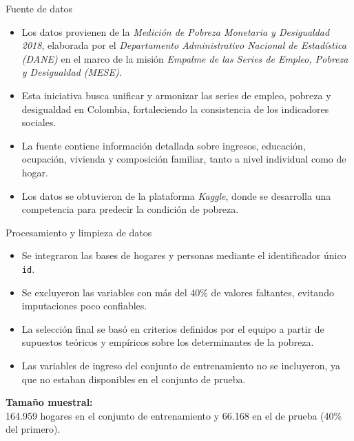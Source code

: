 \documentclass[10pt]{beamer}
\begin{document}
\begin{frame}{Fuente de datos}
\small
\begin{itemize}
    \item Los datos provienen de la \textit{Medición de Pobreza Monetaria y Desigualdad 2018}, elaborada por el \textit{Departamento Administrativo Nacional de Estadística (DANE)} en el marco de la misión \textit{Empalme de las Series de Empleo, Pobreza y Desigualdad (MESE)}.
    \item Esta iniciativa busca unificar y armonizar las series de empleo, pobreza y desigualdad en Colombia, fortaleciendo la consistencia de los indicadores sociales.
    \item La fuente contiene información detallada sobre ingresos, educación, ocupación, vivienda y composición familiar, tanto a nivel individual como de hogar.
    \item Los datos se obtuvieron de la plataforma \textit{Kaggle}, donde se desarrolla una competencia para predecir la condición de pobreza.
\end{itemize}
\end{frame}

\begin{frame}{Procesamiento y limpieza de datos}
\small
\begin{itemize}
    \item Se integraron las bases de hogares y personas mediante el identificador único \texttt{id}.
    \item Se excluyeron las variables con más del 40\% de valores faltantes, evitando imputaciones poco confiables.
\item La selección final se basó en criterios definidos por el equipo a partir de supuestos teóricos y empíricos sobre los determinantes de la pobreza.
    \item Las variables de ingreso del conjunto de entrenamiento no se incluyeron, ya que no estaban disponibles en el conjunto de prueba.
\end{itemize}

\medskip
\textbf{Tamaño muestral:} \\
164.959 hogares en el conjunto de entrenamiento y 66.168 en el de prueba (40\% del primero).
\end{frame}
\end{document}
